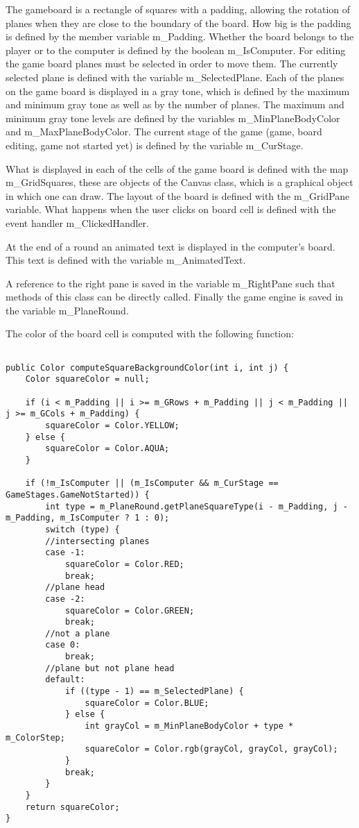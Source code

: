 The gameboard is a rectangle of squares with a padding, allowing the rotation of planes when they are close to the boundary of the board. How big is the padding is defined by the member variable m\_Padding. Whether the board belongs to the player or to the computer is defined by the boolean m\_IsComputer. For editing the game board planes must be selected in order to move them. The currently selected plane is defined with the variable m\_SelectedPlane. Each of the planes on the game board is displayed in a gray tone, which is defined by the maximum and minimum gray tone as well as by the number of planes. The maximum and minimum gray tone levels are defined by the variables m\_MinPlaneBodyColor and m\_MaxPlaneBodyColor. The current stage of the game (game, board editing, game not started yet) is defined by the variable m\_CurStage.

What is displayed in each of the cells of the game board is defined with the map m\_GridSquares, these are objects of the Canvas class, which is a graphical object in which one can draw. The layout of the board is defined with the m\_GridPane variable. What happens when the user clicks on board cell is defined with the event handler m\_ClickedHandler. 

At the end of a round an animated text is displayed in the computer's board. This text is defined with the variable m\_AnimatedText. 

A reference to the right pane is saved in the variable m\_RightPane such that  methods of this class can be directly called. Finally the game engine is saved in the variable m\_PlaneRound.

The color of the board cell is computed with the following function:

\begin{lstlisting}

public Color computeSquareBackgroundColor(int i, int j) {
	Color squareColor = null;
	
	if (i < m_Padding || i >= m_GRows + m_Padding || j < m_Padding || j >= m_GCols + m_Padding) {
		squareColor = Color.YELLOW;
	} else {
		squareColor = Color.AQUA;
	}
	
	if (!m_IsComputer || (m_IsComputer && m_CurStage == GameStages.GameNotStarted)) {
		int type = m_PlaneRound.getPlaneSquareType(i - m_Padding, j - m_Padding, m_IsComputer ? 1 : 0);
		switch (type) {					
		//intersecting planes
		case -1:
			squareColor = Color.RED;
			break;								
		//plane head
		case -2:
			squareColor = Color.GREEN;
			break;			
		//not a plane	
		case 0:
			break;					
		//plane but not plane head
		default:
			if ((type - 1) == m_SelectedPlane) {
				squareColor = Color.BLUE;
			} else {
				int grayCol = m_MinPlaneBodyColor + type * m_ColorStep;
				squareColor = Color.rgb(grayCol, grayCol, grayCol);
			}
			break;						
		}
	}
	return squareColor;
}

\end{lstlisting}

